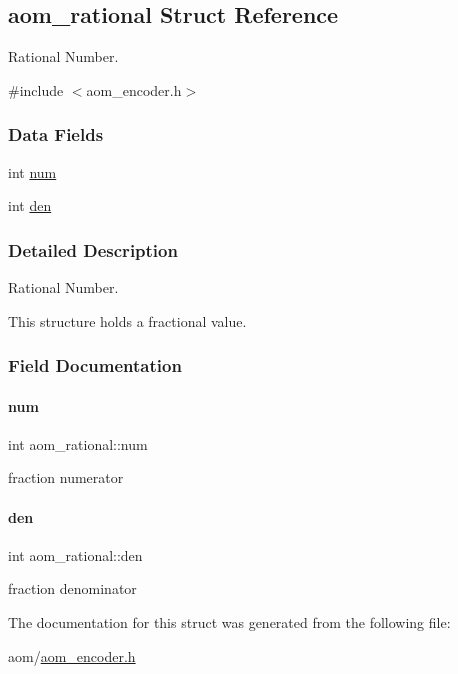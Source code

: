 \hypertarget{structaom__rational}{}\subsection{aom\+\_\+rational Struct Reference}
\label{structaom__rational}


Rational Number.  




{\ttfamily \#include $<$aom\+\_\+encoder.\+h$>$}

\subsubsection*{Data Fields}
\begin{DoxyCompactItemize}
\item 
int \hyperlink{structaom__rational_a7b48174411798c780a15f132c4650839}{num}
\item 
int \hyperlink{structaom__rational_adeddf2ea01c12b7be66536e0a0fb92c5}{den}
\end{DoxyCompactItemize}


\subsubsection{Detailed Description}
Rational Number. 

This structure holds a fractional value. 

\subsubsection{Field Documentation}
\mbox{\label{structaom__rational_a7b48174411798c780a15f132c4650839}} 
\paragraph{\texorpdfstring{num}{num}}
{\footnotesize\ttfamily int aom\+\_\+rational\+::num}

fraction numerator \mbox{\label{structaom__rational_adeddf2ea01c12b7be66536e0a0fb92c5}} 
\paragraph{\texorpdfstring{den}{den}}
{\footnotesize\ttfamily int aom\+\_\+rational\+::den}

fraction denominator 

The documentation for this struct was generated from the following file\+:\begin{DoxyCompactItemize}
\item 
aom/\hyperlink{aom__encoder_8h}{aom\+\_\+encoder.\+h}\end{DoxyCompactItemize}
